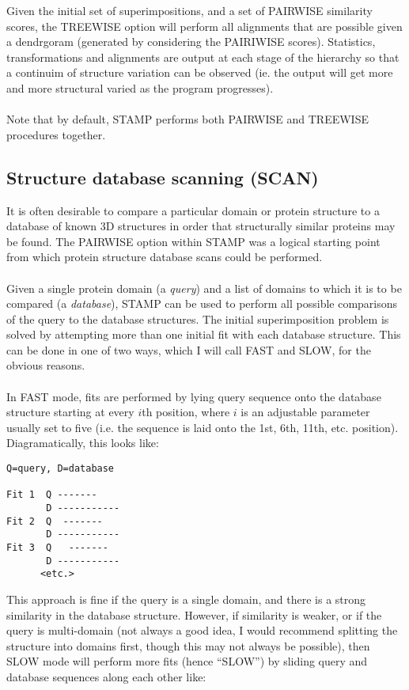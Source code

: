 Given the initial set of superimpositions, and a set of
PAIRWISE similarity scores, the TREEWISE option will
perform all alignments that are possible given a dendrgoram (generated 
by considering the PAIRIWISE scores). 
Statistics, transformations and alignments are output at each stage
of the hierarchy so that a continuim of structure variation can be
observed (ie. the output will get more and more structural varied
as the program progresses).\\
\\
Note that by default, STAMP performs both PAIRWISE and TREEWISE procedures together.

\subsection{Structure database scanning (SCAN)}

It is often desirable to compare a particular domain or protein 
structure to a database of known 3D structures in order that structurally similar 
proteins may be found.  The PAIRWISE option within STAMP was a
logical starting point from which protein structure database scans
could be performed.\\
\\
Given a single protein domain (a {\em query}) and a list of domains to which it is
to be compared (a {\em database}), STAMP can be used to perform all possible
comparisons of the query to the database structures.  The initial
superimposition problem is solved by attempting more than one
initial fit with each database structure.    This can be done in one of two ways,
which I will call FAST and SLOW, for the obvious reasons.\\
\\
In FAST mode, fits are performed by lying
query sequence onto the database structure starting at every $i$th position,
where $i$ is an adjustable parameter usually set to five (i.e. the sequence
is laid onto the 1st, 6th, 11th, etc. position).   Diagramatically, this looks
like:\\

\begin{verbatim}
Q=query, D=database

Fit 1  Q -------
       D -----------
Fit 2  Q  -------
       D -----------
Fit 3  Q   -------
       D -----------
      <etc.>
\end{verbatim}

This approach is fine if the query is a single domain, and there is a strong similarity in
the database structure.  However, if similarity is weaker, or if the query is multi-domain (not
always a good idea, I would recommend splitting the structure into domains first, though this
may not always be possible), then SLOW mode will perform more fits (hence ``SLOW'') by sliding
query and database sequences along each other like:\\

